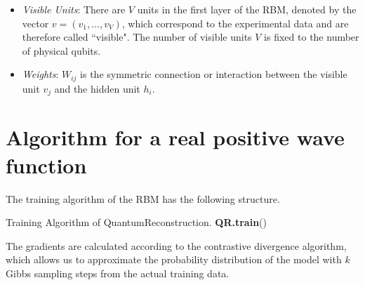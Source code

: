 \documentclass[submission, Phys]{SciPost}
\begin{document}
\begin{itemize}
	\item {\it Visible Units}: There are $V$ units in the first layer of the RBM, denoted by the vector $v=(v_1, ..., v_V)$, which correspond to the experimental data and are therefore called ``visible". The number of visible units $V$ is fixed to the number of physical qubits.

	\item {\it Weights}: $W_{ij}$ is the symmetric connection or interaction between the visible unit $v_j$ and the hidden unit $h_i$.

\end{itemize}



	\section{Algorithm for a real positive wave function}
	The training algorithm of the RBM has the following structure.

	\begin{algorithm}[H]
		\caption{Training Algorithm of QuantumReconstruction. \textbf{QR.train}() }
		\SetAlgoLined

	\end{algorithm}


	The gradients are calculated according to the contrastive divergence algorithm, which allows us to approximate the probability distribution of the model with $k$ Gibbs sampling steps from the actual training data.
\end{document}
